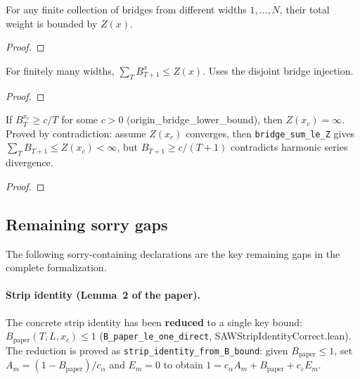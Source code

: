 \begin{lemma}\label{lem:combined_bridge_sum}
\leanok
{}
  For any finite collection of bridges from different widths $1, \ldots, N$,
  their total weight is bounded by $Z(x)$.
\end{lemma}
\begin{proof}
\leanok
\end{proof}

\begin{lemma}\label{lem:bridge_sum_le_Z}
\leanok
{}
  For finitely many widths, $\sum_T B_{T+1}^x \leq Z(x)$.
  Uses the disjoint bridge injection.
\end{lemma}
\begin{proof}
\leanok
\end{proof}

\begin{theorem}\label{thm:Z_div_from_lower}
\leanok
{}
  If $B_T^{x_c} \geq c/T$ for some $c > 0$ (origin\_bridge\_lower\_bound),
  then $Z(x_c) = \infty$. Proved by contradiction: assume $Z(x_c)$ converges,
  then \texttt{bridge\_sum\_le\_Z} gives $\sum_T B_{T+1} \leq Z(x_c) < \infty$,
  but $B_{T+1} \geq c/(T+1)$ contradicts harmonic series divergence.
\end{theorem}
\begin{proof}
\leanok
\end{proof}

\subsection{Remaining sorry gaps}

The following sorry-containing declarations are the key remaining gaps
in the complete formalization.

\paragraph{Strip identity (Lemma~2 of the paper).}
The concrete strip identity has been \textbf{reduced} to a single key bound:
$B_{\mathrm{paper}}(T,L,x_c) \leq 1$ (\texttt{B\_paper\_le\_one\_direct},
SAWStripIdentityCorrect.lean). The reduction is proved as
\texttt{strip\_identity\_from\_B\_bound}: given $B_{\mathrm{paper}} \leq 1$,
set $A_m = (1 - B_{\mathrm{paper}})/c_\alpha$ and $E_m = 0$ to obtain
$1 = c_\alpha A_m + B_{\mathrm{paper}} + c_\varepsilon E_m$.

